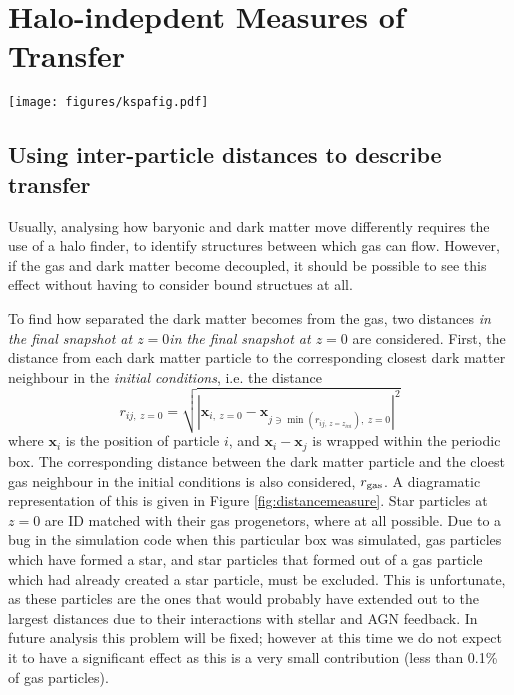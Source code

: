 \section{Halo-indepdent Measures of Transfer}
\label{sec:haloindependent}

\begin{figure*} \centering
	\texttt{[image: figures/kspafig.pdf]} \caption{A
	diagramatic representation of the distance measure. On the left, the
	initial conditions are shown. The blue dark matter particles each find
	their closest dark matter and gas (red) neighbour. These particles are
	then tracked to the final state of the simulation (right) and the
	distances between them calculated again.} \label{fig:distancemeasure}
\end{figure*}

\subsection{Using inter-particle distances to describe transfer}

Usually, analysing how baryonic and dark matter move differently requires the
use of a halo finder, to identify structures between which gas can flow.
However, if the gas and dark matter become decoupled, it should be possible to
see this effect without having to consider bound structues at all.

To find how separated the dark matter becomes from the gas, two distances
\emph{in the final snapshot at $z=0$}\emph{in the final snapshot at $z=0$}  are
considered. First, the distance from each dark matter particle to the
corresponding closest dark matter neighbour in the \emph{initial conditions},
i.e. the distance
\begin{equation}
    r_{ij, ~z=0} = \sqrt{ \left| \mathbf{x}_{i,
    ~z=0} - \mathbf{x}_{j \ni \min(r_{ij, ~z=z_{ini}}), ~z=0} \right|^2 }
    \label{eqn:minimal}
\end{equation}
where $\mathbf{x}_i$ is the position of particle $i$, and $\mathbf{x}_i -
\mathbf{x}_j$ is wrapped within the periodic box. The corresponding distance
between the dark matter particle and the cloest gas neighbour in the initial
conditions is also considered, $r_{\rm gas}$. A diagramatic representation of
this is given in Figure \ref{fig:distancemeasure}. Star particles at $z=0$ are
ID matched with their gas progenetors, where at all possible. Due to a bug in
the simulation code when this particular box was simulated, gas particles which
have formed a star, and star particles that formed out of a gas particle which
had already created a star particle, must be excluded. This is unfortunate, as
these particles are the ones that would probably have extended out to the
largest distances due to their interactions with stellar and AGN feedback. In
future analysis this problem will be fixed; however at this time we do not
expect it to have a significant effect as this is a very small contribution
(less than 0.1\% of gas particles).

